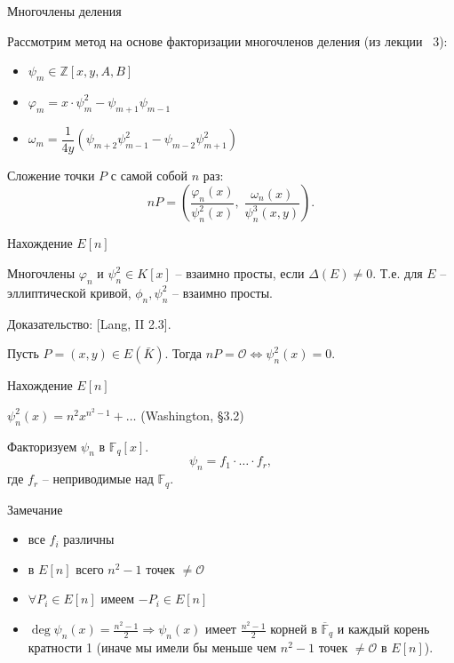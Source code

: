 \documentclass{beamer}
\begin{document}
\begin{frame}{Многочлены деления}
    
    Рассмотрим метод на основе факторизации многочленов деления (из лекции \textnumero~$3$):
    
    \begin{itemize}
        \item $\psi_m \in \mathbb{Z}\left[x,y,A,B\right]$
        \item $\varphi_m = x \cdot \psi_m^2 - \psi_{m + 1} \psi_{m - 1}$
        
        \item $\omega_m = \dfrac{1}{{4y}}\left( {{\psi_{m + 2}}\psi_{m - 1}^2 - {\psi_{m - 2}}\psi_{m + 1}^2} \right)$
    \end{itemize}
    Сложение точки $P$ с самой собой $n$ раз:
    \begin{equation*}
        nP = \left( {\frac{{{\varphi _n}(x)}}{{\psi _n^2(x)}},\;\frac{{{\omega _n}( x )}}{{\psi _n^3(x,y)}}} \right).
    \end{equation*}
\end{frame}

\begin{frame}{Нахождение $E[n]$}
\begin{lemma}
Многочлены ${\varphi _n}$ и $\psi _n^2 \in K\left[ x \right]$ -- взаимно просты, если $\Delta (E) \ne 0$. Т.е. для $E$ -- эллиптической кривой, ${\phi _n}, \psi _n^2$ -- взаимно просты.
\end{lemma}
\structure{$\triangleleft$} Доказательство: [Lang, II 2.3].\structure{$\triangleright$}

\begin{corollary}
Пусть $P = (x,y) \in E(\bar{K})$. Тогда $n P = \mathcal{O} \Leftrightarrow \psi_n^2(x) = 0$.
\end{corollary}
\end{frame}

\begin{frame}{Нахождение $E[n]$}
    \begin{center}
       $\psi_n^2(x) = {n^2}{x^{{n^2} - 1}} +  \ldots$ \hfill {\small(Washington, \S3.2)}
    \end{center}

Факторизуем $\psi_n$ в $\mathbb{F}_q[x]$.
\[\psi_n = f_1 \cdot \ldots \cdot f_r,\]
где $f_r$ -- неприводимые над $\mathbb{F}_q$.
\begin{block}{Замечание}
\begin{itemize}
    \item все $f_i$ различны
    \item в $E[n]$ всего ${n^2} - 1$ точек $\neq \mathcal{O}$
    \item $\forall P_i \in E[n]$ имеем $-P_i \in E[n]$
    \item $\deg {\psi _n}( x ) = \frac{{{n^2} - 1}}{2} \Rightarrow {\psi _n}( x )$ имеет $\frac{{{n^2} - 1}}{2}$ корней в $\overline{\mathbb{F}}_q$ и каждый корень кратности 1 (иначе мы имели бы меньше чем ${n^2} - 1$ точек $ \ne \mathcal{O}$ в $E[n]$). 
\end{itemize}
\end{block}
\end{frame}
\end{document}
